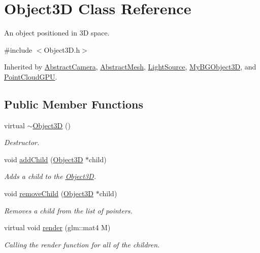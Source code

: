 \hypertarget{class_object3_d}{\section{Object3\-D Class Reference}
\label{class_object3_d}
}


An object positioned in 3\-D space.  




{\ttfamily \#include $<$Object3\-D.\-h$>$}



Inherited by \hyperlink{class_abstract_camera}{Abstract\-Camera}, \hyperlink{class_abstract_mesh}{Abstract\-Mesh}, \hyperlink{class_light_source}{Light\-Source}, \hyperlink{class_my_b_g_object3_d}{My\-B\-G\-Object3\-D}, and \hyperlink{class_point_cloud_g_p_u}{Point\-Cloud\-G\-P\-U}.

\subsection*{Public Member Functions}
\begin{DoxyCompactItemize}
\item 
virtual \hyperlink{class_object3_d_a73b016a1aa7eb3be3c49671f3054565d}{$\sim$\-Object3\-D} ()
\begin{DoxyCompactList}\small\item\em Destructor. \end{DoxyCompactList}\item 
void \hyperlink{class_object3_d_ab3fef9964c95ffe87a6d40c4b2a1dc3c}{add\-Child} (\hyperlink{class_object3_d}{Object3\-D} $\ast$child)
\begin{DoxyCompactList}\small\item\em Adds a child to the \hyperlink{class_object3_d}{Object3\-D}. \end{DoxyCompactList}\item 
void \hyperlink{class_object3_d_a92ca62c895c570d44ed306a8d3610ae9}{remove\-Child} (\hyperlink{class_object3_d}{Object3\-D} $\ast$child)
\begin{DoxyCompactList}\small\item\em Removes a child from the list of pointers. \end{DoxyCompactList}\item 
virtual void \hyperlink{class_object3_d_afa3e765f12707f3dd0fb8d24de9a68b7}{render} (glm\-::mat4 M)
\begin{DoxyCompactList}\small\item\em Calling the render function for all of the children. \end{DoxyCompactList}\end{DoxyCompactItemize}
